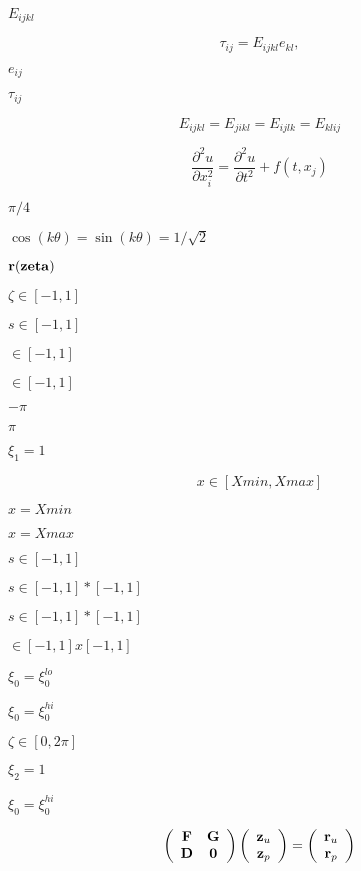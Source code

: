 \documentclass{article}
\begin{document}
$E_{ijkl}$
\pagebreak

\[\tau_{ij} = E_{ijkl} e_{kl},\]
\pagebreak

$e_{ij}$
\pagebreak

$\tau_{ij}$
\pagebreak

\[E_{ijkl} = E_{jikl} = E_{ijlk} = E_{klij}\]
\pagebreak

\[ \frac{\partial^2 u}{\partial x_i^2}= \frac{\partial^2 u}{\partial t^2}+f(t,x_j) \]
\pagebreak

$ \pi/4 $
\pagebreak

$ \cos(k \theta) = \sin(k \theta) = 1/\sqrt{2} $
\pagebreak

$ {\bf r}({\bf zeta}) $
\pagebreak

$ \zeta \in [-1,1] $
\pagebreak

$ s \in [-1,1] $
\pagebreak

$ \in [-1,1] $
\pagebreak

$\in [-1,1] $
\pagebreak

$-\pi$
\pagebreak

$\pi$
\pagebreak

$\xi_1 = 1$
\pagebreak

\[ x \in [Xmin,Xmax] \]
\pagebreak

$x=Xmin$
\pagebreak

$x=Xmax$
\pagebreak

$s \in [-1,1] $
\pagebreak

$ s \in [-1,1]*[-1,1] $
\pagebreak

$s \in [-1,1]*[-1,1] $
\pagebreak

$ \in [-1,1]x[-1,1] $
\pagebreak

$ \xi_0 =  \xi_0^{lo} $
\pagebreak

$ \xi_0 =  \xi_0^{hi} $
\pagebreak

$\zeta \in [0,2\pi]$
\pagebreak

$\xi_2 = 1$
\pagebreak

$\xi_0 = \xi_0^{hi}$
\pagebreak

\[ \left( \begin{array}{cc} {\bf F} & {\bf G} \\ {\bf D} & {\bf 0} \end{array} \right) \left( \begin{array}{c} {\bf z}_u \\ {\bf z}_p \end{array} \right) = \left( \begin{array}{c} {\bf r}_u \\ {\bf r}_p \end{array} \right) \]
\pagebreak
\end{document}
